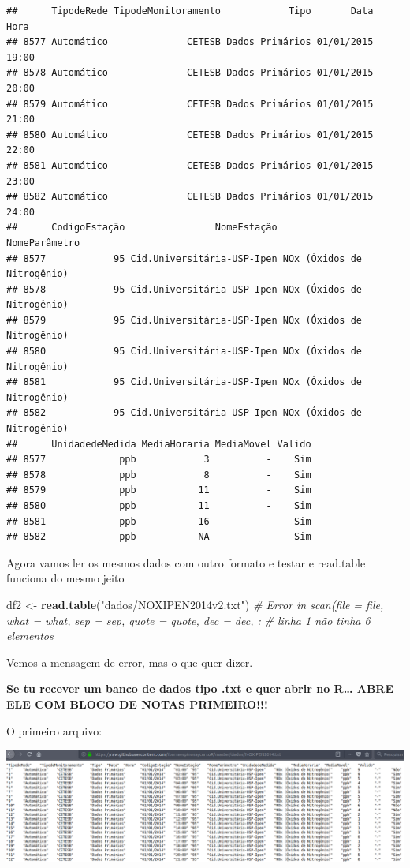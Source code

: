\documentclass[]{book}
\newenvironment{Shaded}{\begin{snugshade}}{\end{snugshade}}
\newcommand{\KeywordTok}[1]{\textcolor[rgb]{0.13,0.29,0.53}{\textbf{#1}}}
\newcommand{\StringTok}[1]{\textcolor[rgb]{0.31,0.60,0.02}{#1}}
\newcommand{\CommentTok}[1]{\textcolor[rgb]{0.56,0.35,0.01}{\textit{#1}}}
\newcommand{\NormalTok}[1]{#1}
\theoremstyle{definition}
\theoremstyle{definition}
\theoremstyle{definition}
\theoremstyle{remark}
\begin{document}
\begin{verbatim}
##      TipodeRede TipodeMonitoramento            Tipo       Data  Hora
## 8577 Automático              CETESB Dados Primários 01/01/2015 19:00
## 8578 Automático              CETESB Dados Primários 01/01/2015 20:00
## 8579 Automático              CETESB Dados Primários 01/01/2015 21:00
## 8580 Automático              CETESB Dados Primários 01/01/2015 22:00
## 8581 Automático              CETESB Dados Primários 01/01/2015 23:00
## 8582 Automático              CETESB Dados Primários 01/01/2015 24:00
##      CodigoEstação                NomeEstação              NomeParâmetro
## 8577            95 Cid.Universitária-USP-Ipen NOx (Óxidos de Nitrogênio)
## 8578            95 Cid.Universitária-USP-Ipen NOx (Óxidos de Nitrogênio)
## 8579            95 Cid.Universitária-USP-Ipen NOx (Óxidos de Nitrogênio)
## 8580            95 Cid.Universitária-USP-Ipen NOx (Óxidos de Nitrogênio)
## 8581            95 Cid.Universitária-USP-Ipen NOx (Óxidos de Nitrogênio)
## 8582            95 Cid.Universitária-USP-Ipen NOx (Óxidos de Nitrogênio)
##      UnidadedeMedida MediaHoraria MediaMovel Valido
## 8577             ppb            3          -    Sim
## 8578             ppb            8          -    Sim
## 8579             ppb           11          -    Sim
## 8580             ppb           11          -    Sim
## 8581             ppb           16          -    Sim
## 8582             ppb           NA          -    Sim
\end{verbatim}

Agora vamos ler os mesmos dados com outro formato e testar e read.table
funciona do mesmo jeito

\begin{Shaded}
\begin{Highlighting}[]
\NormalTok{df2 <-}\StringTok{ }\KeywordTok{read.table}\NormalTok{(}\StringTok{"dados/NOXIPEN2014v2.txt"}\NormalTok{)}
\CommentTok{# Error in scan(file = file, what = what, sep = sep, quote = quote, dec = dec, : }
\CommentTok{# linha 1 não tinha 6 elementos}
\end{Highlighting}
\end{Shaded}

Vemos a mensagem de error, mas o que quer dizer.

\textbf{Se tu recever um banco de dados tipo .txt e quer abrir no
R\ldots{} ABRE ELE COM BLOCO DE NOTAS PRIMEIRO!!!}

O primeiro arquivo:

\includegraphics[width=18.47in]{figuras/f1}
\end{document}

